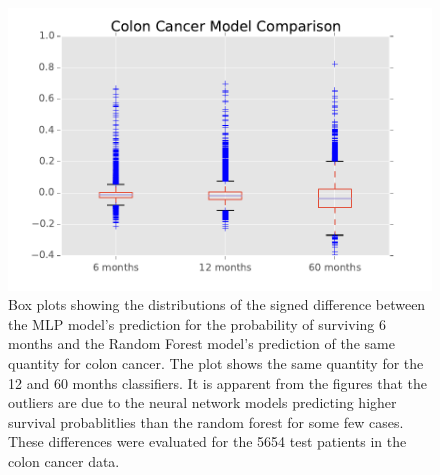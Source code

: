\documentclass[10pt,letterpaper]{article}
\begin{document}
\begin{figure}[tbp]
\centering 
\begin{center}
\includegraphics[width=.90\textwidth,origin=c]{colonbox.pdf}
\caption{\label{fig:colonbox} Box plots showing the distributions of the signed difference between the MLP model's prediction for the probability of surviving 6 months and the Random Forest model's prediction of the same quantity for colon cancer. The plot shows the same quantity for the 12 and 60 months classifiers. It is apparent from the figures that the outliers are due to the neural network models predicting higher survival probablitlies than the random forest for some few cases. These differences were evaluated for the 5654 test patients in the colon cancer data.}
\end{center}
\end{figure}
\end{document}
